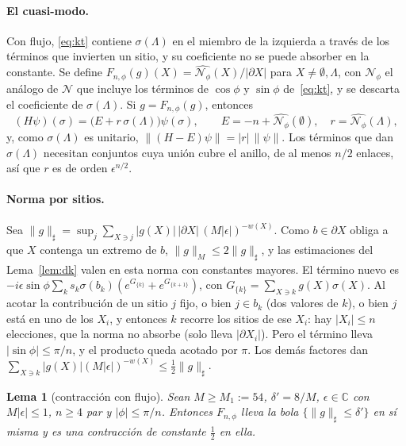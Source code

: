 \documentclass[11pt,a4paper]{article}
\newtheorem{lema}[teorema]{Lema}
\theoremstyle{remark}
\begin{document}
\paragraph{El cuasi-modo.} Con flujo, \eqref{eq:kt} contiene $\sigma(\Lambda)$ en el miembro de la
izquierda a través de los términos que invierten un sitio, y su coeficiente no se puede absorber en la
constante. Se define $F_{n,\phi}(g)(X)=\widehat{\mathcal N_\phi}(X)/|\partial X|$ para
$X\ne\emptyset,\Lambda$, con $\mathcal N_\phi$ el análogo de $\mathcal N$ que incluye los términos de
$\cos\phi$ y $\sin\phi$ de~\eqref{eq:kt}, y se descarta el coeficiente de $\sigma(\Lambda)$. Si
$g=F_{n,\phi}(g)$, entonces
\begin{equation}\label{eq:cuasimodo}
  (H\psi)(\sigma)=\big(E+r\,\sigma(\Lambda)\big)\psi(\sigma),\qquad E=-n+\widehat{\mathcal N_\phi}(\emptyset),\quad
  r=\widehat{\mathcal N_\phi}(\Lambda),
\end{equation}
y, como $\sigma(\Lambda)$ es unitario, $\|(H-E)\psi\|=|r|\,\|\psi\|$. Los términos que dan
$\sigma(\Lambda)$ necesitan conjuntos cuya unión cubre el anillo, de al menos $n/2$ enlaces, así que $r$
es de orden $\epsilon^{n/2}$.

\paragraph{Norma por sitios.} Sea
$\|g\|_\sharp=\sup_j\sum_{X\ni j}|g(X)|\,|\partial X|\,(M|\epsilon|)^{-w(X)}$. Como $b\in\partial X$ obliga a
que $X$ contenga un extremo de $b$, $\|g\|_M\le2\|g\|_\sharp$, y las estimaciones del Lema~\ref{lem:dk}
valen en esta norma con constantes mayores. El término nuevo es
$-i\epsilon\sin\phi\sum_ks_k\sigma(b_k)(e^{G_{\{k\}}}+e^{G_{\{k+1\}}})$, con
$G_{\{k\}}=\sum_{X\ni k}g(X)\sigma(X)$. Al acotar la contribución de un sitio $j$ fijo, o bien
$j\in b_k$ (dos valores de $k$), o bien $j$ está en uno de los $X_i$, y entonces $k$ recorre los sitios
de ese $X_i$: hay $|X_i|\le n$ elecciones, que la norma no absorbe (solo lleva $|\partial X_i|$). Pero
el término lleva $|\sin\phi|\le\pi/n$, y el producto queda acotado por $\pi$. Los demás factores dan
$\sum_{X\ni k}|g(X)|(M|\epsilon|)^{-w(X)}\le\tfrac12\|g\|_\sharp$.

\begin{lema}[contracción con flujo]\label{lem:dkflujo}
Sean $M\ge M_1:=54$, $\delta'=8/M$, $\epsilon\in\mathbb C$ con $M|\epsilon|\le1$, $n\ge4$ par y
$|\phi|\le\pi/n$. Entonces $F_{n,\phi}$ lleva la bola $\{\|g\|_\sharp\le\delta'\}$ en sí misma y es una
contracción de constante $\tfrac12$ en ella.
\end{lema}
\end{document}
